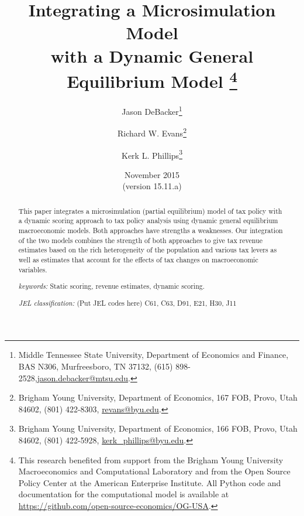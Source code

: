 \documentclass[letterpaper,12pt]{article}
\theoremstyle{definition}
\begin{document}
\begin{titlepage}
\title{Integrating a Microsimulation Model \\
       with a Dynamic General Equilibrium Model
       \thanks{This research benefited from support from the Brigham Young University Macroeconomics and Computational Laboratory and from the Open Source Policy Center at the American Enterprise Institute. All Python code and documentation for the computational model is available at \href{https://github.com/open-source-economics/OG-USA}{https://github.com/open-source-economics/OG-USA}.}
       }
\author{
  Jason DeBacker\footnote{Middle Tennessee State University, Department of Economics and Finance, BAS N306, Murfreesboro, TN 37132, (615) 898-2528,\href{mailto:jason.debacker@mtsu.edu}{jason.debacker@mtsu.edu}.} \\[-2pt]
  \and
  Richard W. Evans\footnote{Brigham Young University, Department of Economics, 167 FOB, Provo, Utah 84602, (801) 422-8303, \href{mailto:revans@byu.edu}{revans@byu.edu}.} \\[-2pt]
  \and
  Kerk L. Phillips\footnote{Brigham Young University, Department of Economics, 166 FOB, Provo, Utah 84602, (801) 422-5928, \href{mailto:kerk_phillips@byu.edu}{kerk\_phillips@byu.edu}.}}
\date{November 2015 \\
  \scriptsize{(version 15.11.a)}}
\maketitle
\vspace{-9mm}
\begin{abstract}
\small{This paper integrates a microsimulation (partial equilibrium) model of tax policy with a dynamic scoring approach to tax policy analysis using dynamic general equilibrium macroeconomic models. Both approaches have strengths a weaknesses. Our integration of the two models combines the strength of both approaches to give tax revenue estimates based on the rich heterogeneity of the population and various tax levers as well as estimates that account for the effects of tax changes on macroeconomic variables.

\vspace{3mm}

\noindent\textit{keywords:}\: Static scoring, revenue estimates, dynamic scoring.

\vspace{3mm}

\noindent\textit{JEL classification:} (Put JEL codes here) C61, C63, D91, E21, H30, J11}
\end{abstract}
\thispagestyle{empty}
\end{titlepage}
\end{document}
